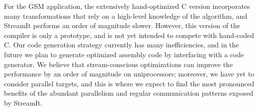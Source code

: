 

For the GSM application, the extensively hand-optimized C version
incorporates many transformations that rely on a high-level knowledge of
the algorithm, and StreamIt performs an order of magnitude slower.
However, this version of the compiler is only a prototype, and is not
yet intended to compete with hand-coded C.  Our code generation strategy
currently has many inefficiencies, and in the future we plan to generate
optimized assembly code by interfacing with a code generator.  We
believe that stream-conscious optimizations can improve the performance
by an order of magnitude on uniprocessors; moreover, we have yet to
consider parallel targets, and this is where we expect to find the most
pronounced benefits of the abundant parallelism and regular
communication patterns exposed by StreamIt.
